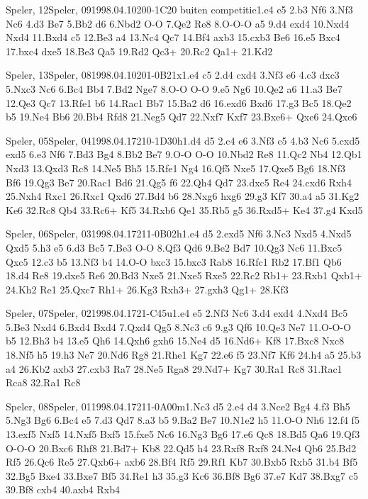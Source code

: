 \documentclass[twocolumn,a4paper,10pt]{report}
\begin{document}
\begin{chessgame}{Speler, 12}{Speler, 09}{1998.04.10}{20}{0-1}{C20 buiten competitie}{1.e4 e5 2.b3 Nf6 3.Nf3 Nc6 4.d3 Be7 5.Bb2 d6 6.Nbd2 O-O 7.Qe2 Re8 8.O-O-O a5 9.d4 exd4 10.Nxd4 Nxd4 11.Bxd4 c5 12.Be3 a4 13.Nc4 Qc7 14.Bf4 axb3 15.cxb3 Be6 16.e5 Bxc4 17.bxc4 dxe5 18.Be3 Qa5 19.Rd2 Qc3+ 20.Rc2 Qa1+ 21.Kd2}\end{chessgame}
\begin{chessgame}{Speler, 13}{Speler, 08}{1998.04.10}{20}{1-0}{B21x}{1.e4 c5 2.d4 cxd4 3.Nf3 e6 4.c3 dxc3 5.Nxc3 Nc6 6.Bc4 Bb4 7.Bd2 Nge7 8.O-O O-O 9.e5 Ng6 10.Qe2 a6 11.a3 Be7 12.Qe3 Qc7 13.Rfe1 b6 14.Rac1 Bb7 15.Ba2 d6 16.exd6 Bxd6 17.g3 Bc5 18.Qe2 b5 19.Ne4 Bb6 20.Bb4 Rfd8 21.Neg5 Qd7 22.Nxf7 Kxf7 23.Bxe6+ Qxe6 24.Qxe6\mate}\end{chessgame}
\begin{chessgame}{Speler, 05}{Speler, 04}{1998.04.17}{21}{0-1}{D30h}{1.d4 d5 2.c4 e6 3.Nf3 c5 4.b3 Nc6 5.cxd5 exd5 6.e3 Nf6 7.Bd3 Bg4 8.Bb2 Be7 9.O-O O-O 10.Nbd2 Re8 11.Qc2 Nb4 12.Qb1 Nxd3 13.Qxd3 Rc8 14.Ne5 Bh5 15.Rfe1 Ng4 16.Qf5 Nxe5 17.Qxe5 Bg6 18.Nf3 Bf6 19.Qg3 Be7 20.Rac1 Bd6 21.Qg5 f6 22.Qh4 Qd7 23.dxc5 Re4 24.cxd6 Rxh4 25.Nxh4 Rxc1 26.Rxc1 Qxd6 27.Bd4 b6 28.Nxg6 hxg6 29.g3 Kf7 30.a4 a5 31.Kg2 Ke6 32.Rc8 Qb4 33.Rc6+ Kf5 34.Rxb6 Qe1 35.Rb5 g5 36.Rxd5+ Ke4 37.g4 Kxd5}\end{chessgame}
\begin{chessgame}{Speler, 06}{Speler, 03}{1998.04.17}{21}{1-0}{B02h}{1.e4 d5 2.exd5 Nf6 3.Nc3 Nxd5 4.Nxd5 Qxd5 5.h3 e5 6.d3 Bc5 7.Be3 O-O 8.Qf3 Qd6 9.Be2 Bd7 10.Qg3 Nc6 11.Bxc5 Qxc5 12.c3 b5 13.Nf3 b4 14.O-O bxc3 15.bxc3 Rab8 16.Rfc1 Rb2 17.Bf1 Qb6 18.d4 Re8 19.dxe5 Re6 20.Bd3 Nxe5 21.Nxe5 Rxe5 22.Rc2 Rb1+ 23.Rxb1 Qxb1+ 24.Kh2 Re1 25.Qxc7 Rh1+ 26.Kg3 Rxh3+ 27.gxh3 Qg1+ 28.Kf3}\end{chessgame}
\begin{chessgame}{Speler, 07}{Speler, 02}{1998.04.17}{21}{\textonehalf-\textonehalf}{C45u}{1.e4 e5 2.Nf3 Nc6 3.d4 exd4 4.Nxd4 Bc5 5.Be3 Nxd4 6.Bxd4 Bxd4 7.Qxd4 Qg5 8.Nc3 c6 9.g3 Qf6 10.Qe3 Ne7 11.O-O-O b5 12.Bh3 b4 13.e5 Qh6 14.Qxh6 gxh6 15.Ne4 d5 16.Nd6+ Kf8 17.Bxc8 Nxc8 18.Nf5 h5 19.h3 Ne7 20.Nd6 Rg8 21.Rhe1 Kg7 22.e6 f5 23.Nf7 Kf6 24.h4 a5 25.b3 a4 26.Kb2 axb3 27.cxb3 Ra7 28.Ne5 Rga8 29.Nd7+ Kg7 30.Ra1 Rc8 31.Rac1 Rca8 32.Ra1 Rc8}\end{chessgame}
\begin{chessgame}{Speler, 08}{Speler, 01}{1998.04.17}{21}{1-0}{A00m}{1.Nc3 d5 2.e4 d4 3.Nce2 Bg4 4.f3 Bh5 5.Ng3 Bg6 6.Bc4 e5 7.d3 Qd7 8.a3 b5 9.Ba2 Be7 10.N1e2 h5 11.O-O Nh6 12.f4 f5 13.exf5 Nxf5 14.Nxf5 Bxf5 15.fxe5 Nc6 16.Ng3 Bg6 17.e6 Qc8 18.Bd5 Qa6 19.Qf3 O-O-O 20.Bxc6 Rhf8 21.Bd7+ Kb8 22.Qd5 h4 23.Rxf8 Rxf8 24.Ne4 Qb6 25.Bd2 Rf5 26.Qc6 Re5 27.Qxb6+ axb6 28.Bf4 Rf5 29.Rf1 Kb7 30.Bxb5 Rxb5 31.b4 Bf5 32.Bg5 Bxe4 33.Bxe7 Bf5 34.Re1 h3 35.g3 Kc6 36.Bf8 Bg6 37.e7 Kd7 38.Bxg7 c5 39.Bf8 cxb4 40.axb4 Rxb4}\end{chessgame}
\end{document}
